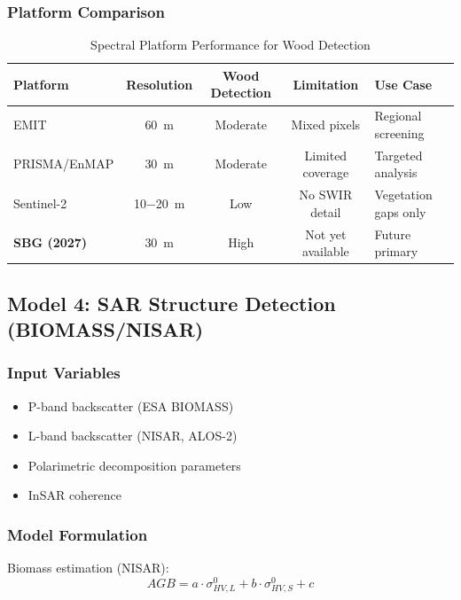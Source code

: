 \documentclass[11pt,letterpaper]{article}
\begin{document}
\subsubsection{Platform Comparison}

\begin{table}[h]
\centering
\caption{Spectral Platform Performance for Wood Detection}
\label{tab:spectral_model_performance}
\begin{tabular}{lcccl}
\toprule
\textbf{Platform} & \textbf{Resolution} & \textbf{Wood Detection} & \textbf{Limitation} & \textbf{Use Case} \\
\midrule
EMIT & \SI{60}{m} & Moderate & Mixed pixels & Regional screening \\
PRISMA/EnMAP & \SI{30}{m} & Moderate & Limited coverage & Targeted analysis \\
Sentinel-2 & \SI{10-20}{m} & Low & No SWIR detail & Vegetation gaps only \\
\textbf{SBG (2027)} & \SI{30}{m} & High & Not yet available & Future primary \\
\bottomrule
\end{tabular}
\end{table}

\subsection{Model 4: SAR Structure Detection (BIOMASS/NISAR)}

\subsubsection{Input Variables}
\begin{itemize}[noitemsep]
    \item P-band backscatter (ESA BIOMASS)
    \item L-band backscatter (NISAR, ALOS-2)
    \item Polarimetric decomposition parameters
    \item InSAR coherence
\end{itemize}

\subsubsection{Model Formulation}

Biomass estimation (NISAR):
\begin{equation}
AGB = a \cdot \sigma^0_{HV,L} + b \cdot \sigma^0_{HV,S} + c
\end{equation}
\end{document}
